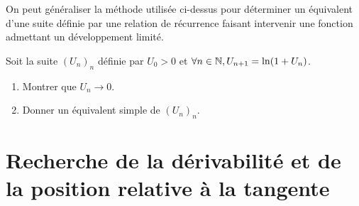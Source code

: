 \documentclass[12pt, a4paper]{report}
\begin{document}
\begin{methodbox}
    On peut généraliser la méthode utilisée ci-dessus pour déterminer un équivalent d'une suite définie par une relation de récurrence faisant intervenir une fonction admettant un développement limité.
\end{methodbox}

\begin{exercise}
    Soit la suite $(U_n)_n$ définie par $U_0 > 0$ et $\forall n \in \mathbb{N}, U_{n+1} = \ln(1 + U_n)$.

    \begin{enumerate}
        \item Montrer que $U_n \to 0$.
        \item Donner un équivalent simple de $(U_n)_n$.
    \end{enumerate}
\end{exercise}

\section{Recherche de la dérivabilité et de la position relative à la tangente}
\end{document}
